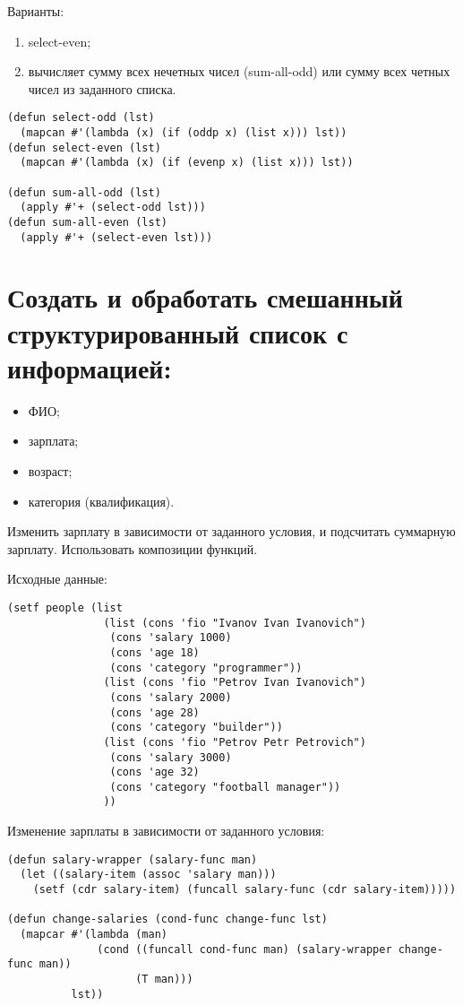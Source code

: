 Варианты:
\begin{enumerate}
    \item select-even;
    \item вычисляет сумму всех нечетных чисел (sum-all-odd) или сумму всех четных чисел из заданного списка.
\end{enumerate}

\begin{lstlisting}
(defun select-odd (lst)
  (mapcan #'(lambda (x) (if (oddp x) (list x))) lst))
(defun select-even (lst)
  (mapcan #'(lambda (x) (if (evenp x) (list x))) lst))

(defun sum-all-odd (lst)
  (apply #'+ (select-odd lst)))
(defun sum-all-even (lst)
  (apply #'+ (select-even lst)))
\end{lstlisting}


\section{Создать и обработать смешанный структурированный список с информацией:}

\begin{itemize}
    \item ФИО;
    \item зарплата;
    \item возраст;
    \item категория (квалификация).
\end{itemize}

Изменить зарплату в зависимости от заданного условия, и подсчитать суммарную зарплату. Использовать композиции функций.

Исходные данные:

\begin{lstlisting}
(setf people (list
               (list (cons 'fio "Ivanov Ivan Ivanovich")
                (cons 'salary 1000)
                (cons 'age 18)
                (cons 'category "programmer"))
               (list (cons 'fio "Petrov Ivan Ivanovich")
                (cons 'salary 2000)
                (cons 'age 28)
                (cons 'category "builder"))
               (list (cons 'fio "Petrov Petr Petrovich")
                (cons 'salary 3000)
                (cons 'age 32)
                (cons 'category "football manager"))
               ))
\end{lstlisting}

Изменение зарплаты в зависимости от заданного условия:

\begin{lstlisting}
(defun salary-wrapper (salary-func man) 
  (let ((salary-item (assoc 'salary man)))
    (setf (cdr salary-item) (funcall salary-func (cdr salary-item)))))

(defun change-salaries (cond-func change-func lst)
  (mapcar #'(lambda (man) 
              (cond ((funcall cond-func man) (salary-wrapper change-func man))
                    (T man)))
          lst))
\end{lstlisting}

